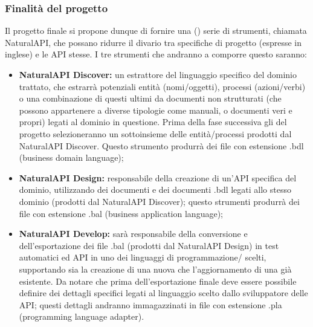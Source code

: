    \subsubsection{Finalità del progetto}
   Il progetto finale si propone dunque di fornire una () serie di strumenti,  chiamata NaturalAPI, che possano ridurre il divario tra specifiche di progetto (espresse in inglese) e le API stesse. I tre strumenti che andranno a comporre questo  saranno:
   \begin{itemize}
   	\item \textbf{NaturalAPI Discover: }un estrattore del linguaggio specifico del dominio trattato, che estrarrà potenziali entità (nomi/oggetti), processi (azioni/verbi) o una combinazione di questi ultimi da documenti non strutturati (che possono appartenere a diverse tipologie come manuali,  o documenti veri e propri) legati al dominio in questione. Prima della fase successiva gli  del progetto selezioneranno un sottoinsieme delle entità/processi prodotti dal NaturalAPI Discover. Questo strumento produrrà dei file con estensione .bdl (business domain language);

   	\item \textbf{NaturalAPI Design: }responsabile della creazione di un'API specifica del dominio, utilizzando dei documenti  e dei documenti .bdl legati allo stesso dominio (prodotti dal NaturalAPI Discover); questo strumenti produrrà dei file con estensione .bal (business application language);

   	\item \textbf{NaturalAPI Develop: }sarà responsabile della conversione e dell'esportazione dei file .bal (prodotti dal NaturalAPI Design) in test automatici ed API in uno dei linguaggi di programmazione/ scelti, supportando sia la creazione di una nuova  che l'aggiornamento di una già esistente. Da notare che prima dell'esportazione finale deve essere possibile definire dei dettagli specifici legati al linguaggio scelto dallo sviluppatore delle API; questi dettagli andranno immagazzinati in file con estensione .pla (programming language adapter).
   	\end{itemize}

